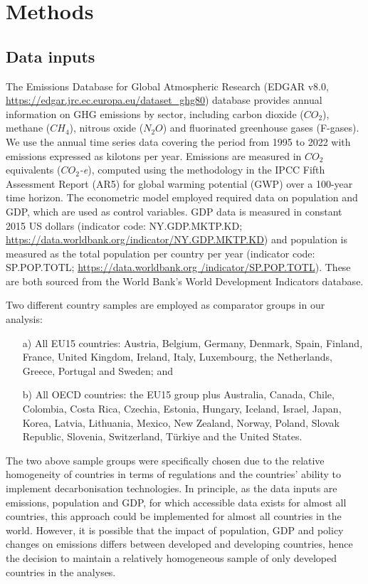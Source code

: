 \documentclass[a4paper]{article}
\begin{document}
\section*{Methods}

\subsection*{Data inputs}\label{subsec:data}

The Emissions Database for Global Atmospheric Research (EDGAR v8.0, \url{https://edgar.jrc.ec.europa.eu/dataset_ghg80}) database \cite{EDGAR_8} provides annual information on GHG emissions by sector, including carbon dioxide ($CO_2$), methane ($CH_4$), nitrous oxide ($N_2O$) and fluorinated greenhouse gases (F-gases). We use the annual time series data covering the period from 1995 to 2022 with emissions expressed as kilotons per year. Emissions are measured in $CO_2$ equivalents ($CO_2$\textit{-e}), computed using the methodology in the IPCC Fifth Assessment Report (AR5) for global warming potential (GWP) over a 100-year time horizon. \cite{IPCC2014} The econometric model employed required data on population and GDP, which are used as control variables. GDP data is measured in constant 2015 US dollars (indicator code: NY.GDP.MKTP.KD; \url{https://data.worldbank.org/indicator/NY.GDP.MKTP.KD}) and population is measured as the total population per country per year (indicator code: SP.POP.TOTL; \url{https://data.worldbank.org /indicator/SP.POP.TOTL}). These are both sourced from the World Bank's World Development Indicators database. \cite{WB_GDP, WB_pop}

Two different country samples are employed as comparator groups in our analysis:
\begin{enumerate}
    \item[a)] All EU15 countries: Austria, Belgium, Germany, Denmark, Spain, Finland, France, United Kingdom, Ireland, Italy, Luxembourg, the Netherlands, Greece, Portugal and Sweden; and
    \item[b)] All OECD countries: the EU15 group plus Australia, Canada, Chile, Colombia, Costa Rica, Czechia, Estonia, Hungary, Iceland, Israel, Japan, Korea, Latvia, Lithuania, Mexico, New Zealand, Norway, Poland, Slovak Republic, Slovenia, Switzerland, Türkiye and the United States.
\end{enumerate}

The two above sample groups were specifically chosen due to the relative homogeneity of countries in terms of regulations and the countries' ability to implement decarbonisation technologies. In principle, as the data inputs are emissions, population and GDP, for which accessible data exists for almost all countries, this approach could be implemented for almost all countries in the world. However, it is possible that the impact of population, GDP and policy changes on emissions differs between developed and developing countries, hence the decision to maintain a relatively homogeneous sample of only developed countries in the analyses.
\end{document}
